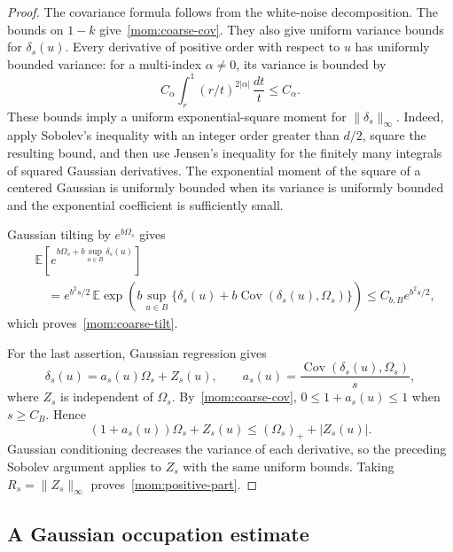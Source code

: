 \documentclass[11pt,letterpaper]{article}
\newcommand{\E}{\mathbb E}
\theoremstyle{definition}
\theoremstyle{remark}
\numberwithin{equation}{section}
\begin{document}
\begin{proof}
The covariance formula follows from the white-noise decomposition. The bounds on $1-k$ give~\eqref{mom:coarse-cov}.  They also give uniform variance bounds for $\delta_s(u)$.  Every derivative of positive order with respect to $u$ has uniformly bounded variance: for a multi-index $\alpha\ne0$, its variance is bounded by
\begin{equation*}
 C_\alpha\int_r^1(r/t)^{2|\alpha|}\,\frac{dt}{t}\le C_\alpha.
\end{equation*}
These bounds imply a uniform exponential-square moment for $\|\delta_s\|_\infty$.  Indeed, apply Sobolev's inequality with an integer order greater than $d/2$, square the resulting bound, and then use Jensen's inequality for the finitely many integrals of squared Gaussian derivatives.  The exponential moment of the square of a centered Gaussian is uniformly bounded when its variance is uniformly bounded and the exponential coefficient is sufficiently small.

Gaussian tilting by $e^{b\Omega_s}$ gives
\begin{equation*}
 \begin{split}
 &\E\!\left[
    e^{b\Omega_s+b\sup_{u\in B}\delta_s(u)}
  \right]\\
 &\quad=e^{b^2s/2}\,
  \E\exp\!\left(
    b\sup_{u\in B}
      \{\delta_s(u)+b\operatorname{Cov}(\delta_s(u),\Omega_s)\}
  \right)
  \le C_{b,B}e^{b^2s/2},
 \end{split}
 \end{equation*}
which proves~\eqref{mom:coarse-tilt}.

For the last assertion, Gaussian regression gives
\begin{equation*}
 \delta_s(u)=a_s(u)\Omega_s+Z_s(u),\qquad
 a_s(u)=\frac{\operatorname{Cov}(\delta_s(u),\Omega_s)}s,
 \end{equation*}
where $Z_s$ is independent of $\Omega_s$. By~\eqref{mom:coarse-cov}, $0\le1+a_s(u)\le1$ when $s\ge C_B$.  Hence
\begin{equation*}
 (1+a_s(u))\Omega_s+Z_s(u)
 \le(\Omega_s)_++|Z_s(u)|.
\end{equation*}
Gaussian conditioning decreases the variance of each derivative, so the preceding Sobolev argument applies to $Z_s$ with the same uniform bounds.  Taking $R_s=\|Z_s\|_\infty$ proves~\eqref{mom:positive-part}.
\end{proof}

\subsection{A Gaussian occupation estimate}
\end{document}
